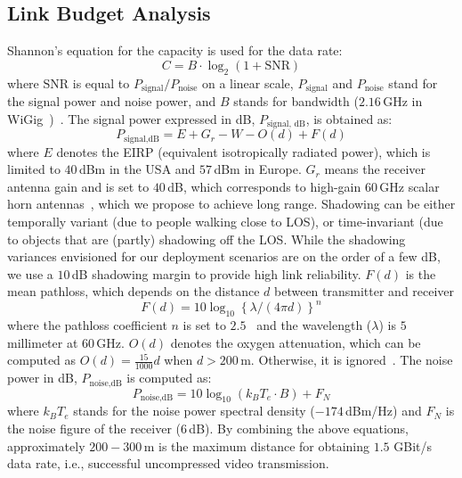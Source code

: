 \documentclass[conference]{IEEEtran}
\begin{document}
\subsection{Link Budget Analysis}\label{sec:refsysmodel-lba}
Shannon's equation for the capacity is used for the data rate:
\begin{equation}
C = B\cdot\log_{2}\left(1+\text{SNR}\right)\label{eq:shannon}
\end{equation}
where $\text{SNR}$ is equal to $P_{\text{signal}}/P_{\text{noise}}$ on a linear scale, $P_{\text{signal}}$ and $P_{\text{noise}}$ stand for the signal power and noise power, and $B$ stands for bandwidth ($2.16$\,GHz in WiGig~\cite{11ad})~\cite{molisch11book}.
The signal power expressed in dB, $P_{\text{signal, dB}}$, is obtained as:
\begin{equation}
P_{\text{signal,dB}} = E + G_{r} - W -O(d) + F(d)
\end{equation}
where $E$ denotes the EIRP (equivalent isotropically radiated power), which is limited to $40$\,dBm in the USA and $57$\,dBm in Europe.
$G_{r}$ means the receiver antenna gain and is set to $40$\,dB, which corresponds to high-gain 60\,GHz scalar horn antennas~\cite{comotech}, which we propose to achieve long range.
Shadowing can be either temporally variant (due to people walking close to LOS), or time-invariant (due to objects that are (partly) shadowing off the LOS. While the shadowing variances envisioned for our deployment scenarios are on the order of a few dB, we use a $10$\,dB shadowing margin to provide high link reliability.
$F(d)$ is the mean pathloss, which depends on the distance $d$ between transmitter and receiver
\begin{equation}
F(d) = 10\log_{10}\left\{\lambda/(4\pi d)\right\}^{n}
\end{equation}
where the pathloss coefficient $n$ is set to $2.5$~\cite{60ghz} and the wavelength ($\lambda$) is
$5$\,millimeter at $60$\,GHz.
$O(d)$ denotes the oxygen attenuation, which can be computed as $O(d) = \frac{15}{1000}d$ when $d > 200$\,m. Otherwise, it is ignored~\cite{60ghz}.
The noise power in dB, $P_{\text{noise,dB}}$ is computed as:
\begin{equation}
P_{\text{noise,dB}} = 10\log_{10}\left(k_{B}T_{e}\cdot B\right) + F_{N}
\end{equation}
where $k_{B}T_{e}$ stands for the noise power spectral density ($-174$\,dBm/Hz) and $F_{N}$ is the noise figure of the receiver ($6$\,dB).
By combining the above equations, approximately $200 - 300$\,m is the maximum distance for obtaining $1.5$ GBit/s data rate, i.e., successful uncompressed video transmission.
\end{document}
